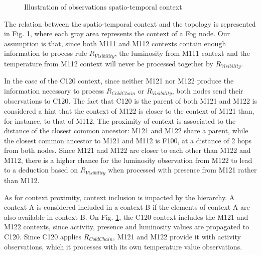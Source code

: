 \documentclass[sw]{iosart2x}
\begin{document}
\begin{figure}
	\centering
	\caption{Illustration of observations spatio-temporal context}
	\label{fig:contextuality}
	\scalebox{0.75}{
		
	}
\end{figure}

The relation between the spatio-temporal context and the topology is represented in Fig. \ref{fig:contextuality}, where each gray area represents the context of a Fog node.
Our assumption is that, since both M111 and M112 contexts contain enough information to process rule $R_{Visibility}$, the luminosity from M111 context and the temperature from M112 context will never be processed together by $R_{Visibility}$.

In the case of the C120 context, since neither M121 nor M122 produce the information necessary to process $R_{ColdChain}$ or $R_{Visibility}$, both nodes send their observations to C120.
The fact that C120 is the parent of both M121 and M122 is considered a hint that the context of M122 is closer to the context of M121 than, for instance, to that of M112.
The proximity of context is associated to the distance of the closest common ancestor: M121 and M122 share a parent, while the closest common ancestor to M121 and M112 is F100, at a distance of 2 hops from both nodes.
Since M121 and M122 are closer to each other than M122 and M112, there is a higher chance for the luminosity observation from M122 to lead to a deduction based on $R_{Visibility}$ when processed with presence from M121 rather than M112.

As for context proximity, context inclusion is impacted by the hierarchy.
A context A is considered included in a context B if the elements of context A are also available in context B.
On Fig. \ref{fig:contextuality}, the C120 context includes the M121 and M122 contexts, since activity, presence and luminosity values are propagated to C120.
Since C120 applies $R_{ColdChain}$, M121 and M122 provide it with activity observations, which it processes with its own temperature value observations.
\end{document}
